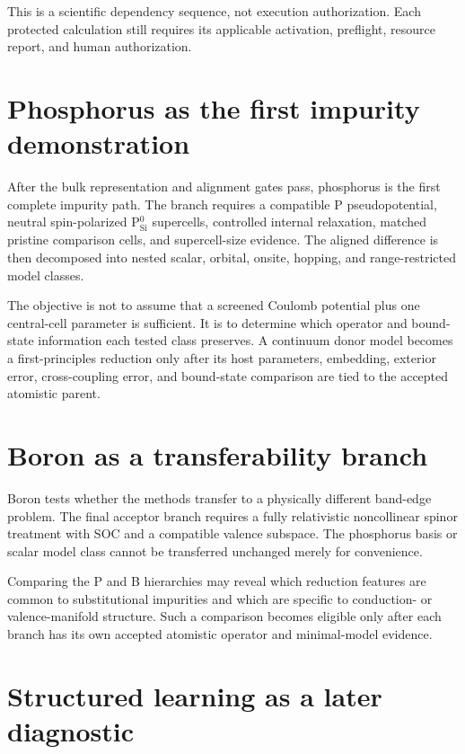 This is a scientific dependency sequence, not execution authorization. Each
protected calculation still requires its applicable activation, preflight,
resource report, and human authorization.

\section{Phosphorus as the first impurity demonstration}

After the bulk representation and alignment gates pass, phosphorus is the first
complete impurity path. The branch requires a compatible P pseudopotential,
neutral spin-polarized P$_\mathrm{Si}^{0}$ supercells, controlled internal
relaxation, matched pristine comparison cells, and supercell-size evidence. The
aligned difference is then decomposed into nested scalar, orbital, onsite,
hopping, and range-restricted model classes.

The objective is not to assume that a screened Coulomb potential plus one
central-cell parameter is sufficient. It is to determine which operator and
bound-state information each tested class preserves. A continuum donor model
becomes a first-principles reduction only after its host parameters, embedding,
exterior error, cross-coupling error, and bound-state comparison are tied to the
accepted atomistic parent.

\section{Boron as a transferability branch}

Boron tests whether the methods transfer to a physically different band-edge
problem. The final acceptor branch requires a fully relativistic noncollinear
spinor treatment with SOC and a compatible valence subspace. The phosphorus
basis or scalar model class cannot be transferred unchanged merely for
convenience.

Comparing the P and B hierarchies may reveal which reduction features are common
to substitutional impurities and which are specific to conduction- or
valence-manifold structure. Such a comparison becomes eligible only after each
branch has its own accepted atomistic operator and minimal-model evidence.

\section{Structured learning as a later diagnostic}

